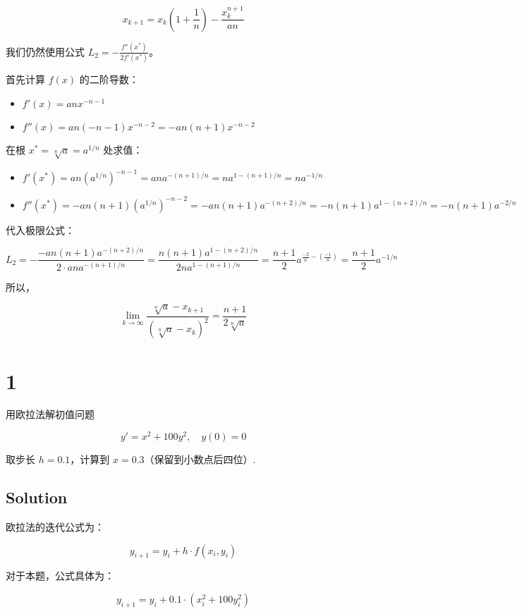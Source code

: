 \documentclass[11pt]{article}
\providecommand{\tightlist}{%
      \setlength{\itemsep}{0pt}\setlength{\parskip}{0pt}}
\begin{document}
\[ x_{k+1} = x_k \left( 1 + \frac{1}{n} \right) - \frac{x_k^{n+1}}{an} \]

我们仍然使用公式 \(L_2 = -\frac{f''(x^*)}{2f'(x^*)}\)。

首先计算 \(f(x)\) 的二阶导数：

\begin{itemize}
\tightlist
\item
  \(f'(x) = anx^{-n-1}\)
\item
  \(f''(x) = an(-n-1)x^{-n-2} = -an(n+1)x^{-n-2}\)
\end{itemize}

在根 \(x^* = \sqrt[n]{a} = a^{1/n}\) 处求值：

\begin{itemize}
\tightlist
\item
  \(f'(x^*) = an(a^{1/n})^{-n-1} = an a^{-(n+1)/n} = n a^{1 - (n+1)/n} = n a^{-1/n}\)
\item
  \(f''(x^*) = -an(n+1)(a^{1/n})^{-n-2} = -an(n+1)a^{-(n+2)/n} = -n(n+1)a^{1 - (n+2)/n} = -n(n+1)a^{-2/n}\)
\end{itemize}

代入极限公式：

\[ L_2 = -\frac{-an(n+1)a^{-(n+2)/n}}{2 \cdot an a^{-(n+1)/n}} = \frac{n(n+1)a^{1-(n+2)/n}}{2na^{1-(n+1)/n}} = \frac{n+1}{2} a^{\frac{-2}{n} - (\frac{-1}{n})} = \frac{n+1}{2} a^{-1/n} \]

所以，

\[ \lim_{k\to\infty} \frac{\sqrt[n] a - x_{k + 1}}{(\sqrt [n] a - x_k)^2} = \frac{n+1}{2\sqrt[n]{a}} \]

    \section{1}\label{section}

用欧拉法解初值问题

\[
y' = x^2 + 100y^2, \quad y(0) = 0
\]

取步长 \(h = 0.1\)，计算到 \(x = 0.3\)（保留到小数点后四位）.

\subsection{Solution}\label{solution}

欧拉法的迭代公式为：

\[ y_{i+1} = y_i + h \cdot f(x_i, y_i) \]

对于本题，公式具体为：

\[ y_{i+1} = y_i + 0.1 \cdot (x_i^2 + 100y_i^2) \]
\end{document}

